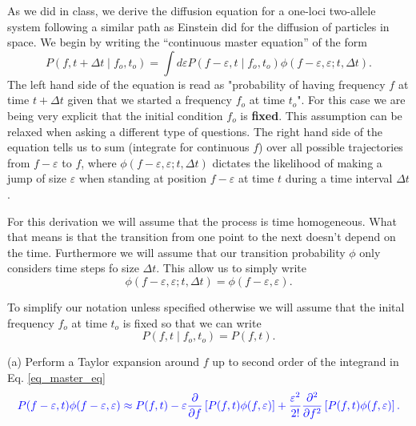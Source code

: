 \documentclass[12pt]{article}    %
\newcommand{\ee}{\varepsilon}
\newcommand{\DD}{\Delta}
\begin{document}
As we did in class, we derive the diffusion equation for a one-loci two-allele
system following a similar path as Einstein did for the diffusion of particles
in space. We begin by writing the “continuous master equation” of the form\\
\begin{equation} \label{eq_master_eq}
    P(f, t+\DD t \mid f_o, t_o) = \int d\ee
  P(f - \ee, t \mid f_o, t_o)
  \phi (f - \ee, \ee; t, \DD t).
\end{equation}
The left hand side of the equation is read as "probability of having frequency
$f$ at time $t + \DD t$ given that we started a frequency $f_o$ at time
$t_o$". For this case we are being very explicit that the initial condition
$f_o$ is \textbf{fixed}. This assumption can be relaxed when asking a different
type of questions. The right hand side of the equation tells us to sum
(integrate for continuous $f$) over all possible trajectories from
$f - \ee$ to $f$, where $\phi (f - \ee, \ee; t, \DD
t)$ dictates the likelihood of making a jump of size $\ee$ when standing
at position $f - \ee$ at time $t$ during a time interval $\DD t$.

For this derivation we will assume that the process is time homogeneous. What
that means is that the transition from one point to the next doesn't depend on
the time. Furthermore we will assume that our transition probability $\phi$ only
considers time steps fo size $\DD t$. This allow us to simply write
\begin{equation}
  \phi (f - \ee, \ee; t, \DD t) =
  \phi (f - \ee, \ee).
\end{equation}

To simplify our notation unless specified otherwise we will assume that the
inital frequency $f_o$ at time $t_o$ is fixed so that we can write
\begin{equation}
  P(f, t \mid f_o, t_o) = P(f, t).
\end{equation}

\noindent
(a) Perform a Taylor expansion around $f$ up to second order of the integrand
in Eq. \ref{eq_master_eq}
\begin{equation}
  \color{blue}
  P(f - \ee, t) \phi(f - \ee, \ee) \approx
  P(f, t) -
  \ee {\partial \over \partial f}\left[ P(f, t) \phi(f, \ee) \right] +
  {\ee^2 \over 2!} {\partial^2 \over \partial f^2}
  \left[ P(f, t) \phi(f, \ee) \right].
\end{equation}
\end{document}
